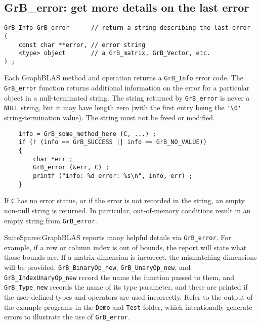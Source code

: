 \documentclass[12pt]{article}
\begin{document}
{\newpage
\subsection{{\sf GrB\_error:} get more details on the last error} %
\label{error}

\begin{mdframed}[userdefinedwidth=6in]
{\footnotesize
\begin{verbatim}
GrB_Info GrB_error      // return a string describing the last error
( 
    const char **error, // error string
    <type> object       // a GrB_matrix, GrB_Vector, etc.
) ;
\end{verbatim}
}\end{mdframed}

Each GraphBLAS method and operation returns a \verb'GrB_Info' error code.  The
\verb'GrB_error' function returns additional information on the error for a
particular object in a null-terminated string.  The string returned by
\verb'GrB_error' is never a \verb'NULL' string, but it may have length zero
(with the first entry being the \verb"'\0'" string-termination value).  The
string must not be freed or modified.

    {\footnotesize
    \begin{verbatim}
    info = GrB_some_method_here (C, ...) ;
    if (! (info == GrB_SUCCESS || info == GrB_NO_VALUE))
    {
        char *err ;
        GrB_error (&err, C) ;
        printf ("info: %d error: %s\n", info, err) ;
    } \end{verbatim}}

If \verb'C' has no error status, or if the error is not recorded in
the string, an empty non-null string is returned.  In particular,
out-of-memory conditions result in an empty string from \verb'GrB_error'.

SuiteSparse:GraphBLAS reports many helpful details via \verb'GrB_error'.  For
example, if a row or column index is out of bounds, the report will state what
those bounds are.  If a matrix dimension is incorrect, the mismatching
dimensions will be provided.  \verb'GrB_BinaryOp_new', \verb'GrB_UnaryOp_new',
and \verb'GrB_IndexUnaryOp_new' record the name the function passed to them, and
\verb'GrB_Type_new' records the name of its type parameter, and these are
printed if the user-defined types and operators are used incorrectly.  Refer to
the output of the example programs in the \verb'Demo' and \verb'Test' folder,
which intentionally generate errors to illustrate the use of \verb'GrB_error'.

}
\end{document}
